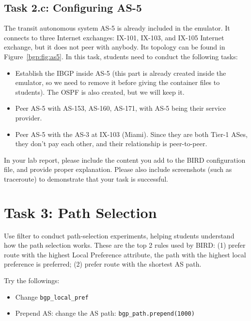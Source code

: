 \subsection{Task 2.c: Configuring AS-5} 

The transit autonomous system AS-5 is already included in the emulator. 
It connects to three 
Internet exchanges: IX-101, IX-103, and IX-105 Internet exchange,
but it does not peer with anybody. Its topology can be found 
in Figure~\ref{bgp:fig:as5}.
In this task, students need to conduct the following tasks:

\begin{itemize}[noitemsep]
  \item Establish the IBGP inside AS-5 (this part is already created 
    inside the emulator, so we need to remove it before giving the container 
    files to students). The OSPF is also created, but we will keep it. 

  \item Peer AS-5 with AS-153, AS-160, AS-171, with AS-5 being their service provider.

  \item Peer AS-5 with the AS-3 at IX-103 (Miami). Since they are both Tier-1 ASes,
    they don't pay each other, and their relationship is peer-to-peer.
\end{itemize}


In your lab report, please include the content you add to the 
BIRD configuration file, and provide proper explanation.
Please also include screenshots (such as traceroute) to demonstrate 
that your task is successful. 


\section{Task 3: Path Selection} 

Use filter to conduct path-selection experiments, helping students
understand how the path selection works.
These are the top 2 rules used by BIRD: 
(1) prefer route with the highest Local Preference attribute,
the path with the highest local preference is preferred;
(2) prefer route with the shortest AS path.


Try the followings:
\begin{itemize}
  \item Change \texttt{bgp\_local\_pref} 
  \item Prepend AS: change the AS path: \texttt{bgp\_path.prepend(1000)} 
\end{itemize}
 

